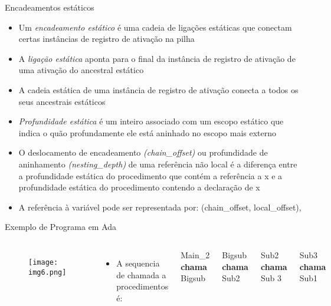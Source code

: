 \documentclass[10pt]{beamer}
\begin{document}
\begin{frame}{Encadeamentos estáticos}

\begin{itemize}
	\item Um \textit{encadeamento estático} é uma cadeia de ligações estáticas que conectam certas instâncias de registro de ativação na pilha
	\item A \textit{ligação estática} aponta para o final da instância de registro de ativação de uma ativação do ancestral estático 
	\item A cadeia estática de uma instância de registro de ativação conecta a todos os seus ancestrais estáticos
	\item \textit{Profundidade estática} é um inteiro associado com um escopo estático que indica o quão profundamente ele está aninhado no escopo mais externo
	\item O deslocamento de encadeamento \textit{(chain\_offset)} ou profundidade de aninhamento \textit{(nesting\_depth)} de uma referência não local é a diferença entre a profundidade estática do procedimento que contém a referência a x e a profundidade estática do procedimento contendo a declaração de x
	\item A referência à variável pode ser representada por: (chain\_offset, local\_offset),
\end{itemize}

\end{frame}

\begin{frame}{Exemplo de Programa em Ada}
 \begin{columns}[T,onlytextwidth]
    \begin{figure}
          \texttt{[image: img6.png]}
        \end{figure}
        \begin{itemize}
    	    \item A sequencia de chamada a procedimentos é:
        \end{itemize}
        \hspace{1cm} Main\_2 \textbf{chama} Bigsub
        
        \hspace{1cm} Bigsub \textbf{chama} Sub2
        
        \hspace{1cm} Sub2 \textbf{chama}  Sub 3
        
        \hspace{1cm} Sub3 \textbf{chama} Sub1
    
\end{columns}
\end{frame}
\end{document}
